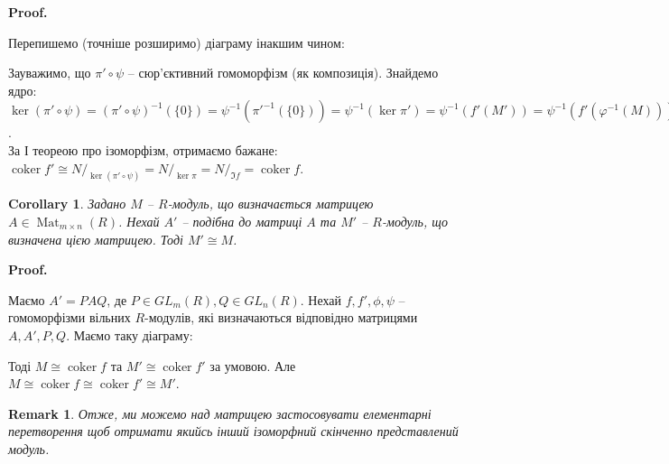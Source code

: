 \documentclass[a4paper, 10pt]{article}
\makeatletter
\theoremstyle{theoremdd}
\theoremstyle{theoremdd}
\theoremstyle{theoremdd}
\theoremstyle{theoremdd}
\theoremstyle{theoremdd}
\theoremstyle{theoremdd}
\theoremstyle{theoremdd}
\theoremstyle{theoremdd}
\theoremstyle{theoremdd}
\theoremstyle{theoremdd}
\theoremstyle{theoremdd}
\newtheorem{remark}[theorem]{Remark}
\theoremstyle{theoremdd}
\theoremstyle{theoremdd}
\theoremstyle{theoremdd}
\newtheorem{corollary}[theorem]{Corollary}
\theoremstyle{theoremdd}
\renewenvironment{proof}[1][Proof.\\]{\par
\pushQED{\hfill \qed}%
\normalfont \topsep6\p@\@plus6\p@\relax
\trivlist
\item\relax
{\bfseries
#1\@addpunct{.}}\hspace\labelsep\ignorespaces
}{%
\popQED\endtrivlist\@endpefalse
}
\DeclareMathOperator{\Mat}{Mat}
\DeclareMathOperator{\coker}{coker}
\makeatother
\begin{document}
\begin{proof}
Перепишемо (точніше розширимо) діаграму інакшим чином:
\begin{figure}[H]
\centering
{}
\end{figure}
Зауважимо, що $\pi' \circ \psi$ -- сюр'єктивний гомоморфізм (як композиція). Знайдемо ядро:\\
$\ker (\pi' \circ \psi) = (\pi' \circ \psi)^{-1}(\{0\}) = \psi^{-1}({\pi'}^{-1}(\{0\})) = \psi^{-1} (\ker \pi') = \psi^{-1}(f'(M')) = \psi^{-1}(f'(\varphi^{-1}(M))) = (\psi^{-1} \circ f' \circ \varphi^{-1}) = f(M) = \ker \pi$.\\
За І теореою про ізоморфізм, отримаємо бажане: \\
$\coker f' \cong N/_{\ker (\pi' \circ \psi)} = N/_{\ker \pi} = N/_{\Im f} = \coker f$.
\end{proof}

\begin{corollary}
Задано $M$ -- $R$-модуль, що визначається матрицею $A \in \Mat_{m \times n}(R)$. Нехай $A'$ -- подібна до матриці $A$ та $M'$ -- $R$-модуль, що визначена цією матрицею. Тоді $M' \cong M$.
\end{corollary}

\begin{proof}
Маємо $A' = PAQ$, де $P \in GL_m(R), Q \in GL_n(R)$. Нехай $f,f',\phi,\psi$ -- гомоморфізми вільних $R$-модулів, які визначаються відповідно матрицями $A,A',P,Q$. Маємо таку діаграму:
\begin{figure}[H]
\centering
{}
\end{figure}
Тоді $M \cong \coker f$ та $M' \cong \coker f'$ за умовою. Але \\
$M \cong \coker f \cong \coker f' \cong M'$.
\end{proof}

\begin{remark}
Отже, ми можемо над матрицею застосовувати елементарні перетворення щоб отримати якийсь інший ізоморфний скінченно представлений модуль.
\end{remark}
\end{document}
